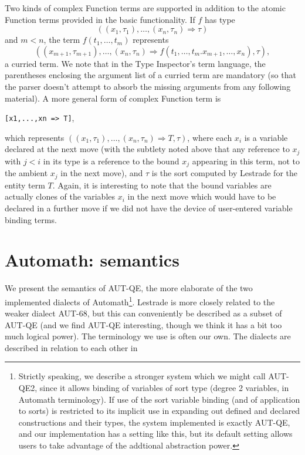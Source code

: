 \documentclass[submission,copyright,creativecommons]{eptcs}
\begin{document}
Two kinds of complex Function terms are supported in addition to the atomic Function terms provided in the basic functionality.  If $f$ has
type $$((x_1,\tau_1),\ldots,(x_n,\tau_n) \Rightarrow \tau)$$ and $m<n$, the term $f(t_1,\ldots,t_m)$ represents
$$((x_{m+1},\tau_{m+1}),\ldots,(x_n,\tau_n) \Rightarrow f(t_1,\ldots,t_m.x_{m+1},\ldots,x_n),\tau),$$ a curried term.  We note that in the Type Inspector's term language, the parentheses enclosing the argument list of a curried term are mandatory (so that the parser doesn't attempt to absorb the missing arguments from any following material).  A more general form of complex Function term is \begin{center}{\tt [x1,...,xn => T]},\end{center}which represents
$((x_1,\tau_1),\ldots,(x_n,\tau_n) \Rightarrow T,\tau)$, where each $x_i$ is a variable declared at the next move (with the subtlety noted above that
any reference to $x_j$ with $j<i$ in its type is a reference to the bound $x_j$ appearing in this term, not to the ambient $x_j$ in the next move), and $\tau$ is the sort computed by Lestrade for the entity term $T$.  Again, it is interesting to note that the bound variables are actually clones of the variables $x_i$ in the next move which would have to be declared in a further move if we did not have the device of user-entered variable binding terms.



\section{Automath:  semantics}

We present the semantics of AUT-QE, the more elaborate of the two implemented dialects of Automath\footnote{Strictly speaking, we describe a stronger system which we might call AUT-QE2, since it allows binding of variables of sort type (degree 2 variables, in Automath terminology).  If use of the sort variable binding (and of application to sorts) is restricted to its implicit use in expanding out defined and declared constructions  and their types, the system implemented is exactly AUT-QE, and our implementation has a setting like this, but its default setting allows users to take advantage of the addtional abstraction power.}.  Lestrade is more closely related to the weaker dialect AUT-68, but this can conveniently be described as a subset of AUT-QE (and we find AUT-QE interesting, though we think it has a bit too much logical power).  The terminology we use is often our own.  The dialects are described in relation to each other in \cite{vandaalena3}
\end{document}
